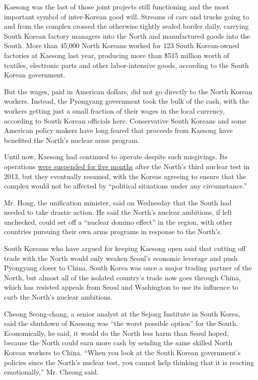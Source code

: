 Kaesong was the last of those joint projects still functioning and the
most important symbol of inter-Korean good will. Streams of cars and
trucks going to and from the complex crossed the otherwise tightly
sealed border daily, carrying South Korean factory managers into the
North and manufactured goods into the South. More than 45,000 North
Koreans worked for 123 South Korean-owned factories at Kaesong last
year, producing more than \$515 million worth of textiles, electronic
parts and other labor-intensive goods, according to the South Korean
government.

But the wages, paid in American dollars, did not go directly to the
North Korean workers. Instead, the Pyongyang government took the bulk of
the cash, with the workers getting just a small fraction of their wages
in the local currency, according to South Korean officials here.
Conservative South Koreans and some American policy makers have long
feared that proceeds from Kaesong have benefited the North's nuclear
arms program.

Until now, Kaesong had continued to operate despite such misgivings. Its
operations
\href{http://www.nytimes.com/2013/05/04/world/asia/last-south-koreans-leave-industrial-park-in-north.html}{were
suspended for five months} after the North's third nuclear test in 2013,
but they eventually resumed, with the Koreas agreeing to ensure that the
complex would not be affected by ``political situations under any
circumstance.''

Mr. Hong, the unification minister, said on Wednesday that the South had
needed to take drastic action. He said the North's nuclear ambitions, if
left unchecked, could set off a ``nuclear domino effect'' in the region,
with other countries pursuing their own arms programs in response to the
North's.

South Koreans who have argued for keeping Kaesong open said that cutting
off trade with the North would only weaken Seoul's economic leverage and
push Pyongyang closer to China. South Korea was once a major trading
partner of the North, but almost all of the isolated country's trade now
goes through China, which has resisted appeals from Seoul and Washington
to use its influence to curb the North's nuclear ambitions.

Cheong Seong-chang, a senior analyst at the Sejong Institute in South
Korea, said the shutdown of Kaesong was ``the worst possible option''
for the South. Economically, he said, it would do the North less harm
than Seoul hoped, because the North could earn more cash by sending the
same skilled North Korean workers to China. ``When you look at the South
Korean government's policies since the North's nuclear test, you cannot
help thinking that it is reacting emotionally,'' Mr. Cheong said.


